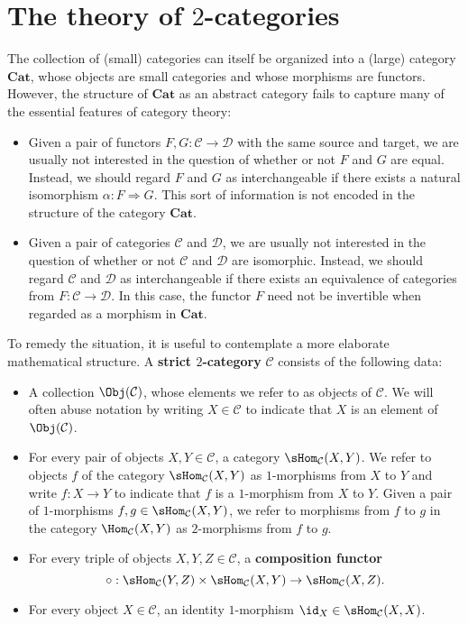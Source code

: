 \section{The theory of \texorpdfstring{$2$}{2}-categories}
The collection of (small) categories can itself be organized into a (large) category $\mathbf{Cat}$, whose objects are small categories and whose morphisms are functors. However, the structure of $\mathbf{Cat}$ as an abstract category fails to capture many of the essential features of category theory:
\begin{itemize}
\item Given a pair of functors $F,G:\mathcal{C}\to\mathcal{D}$ with the same source and target, we are usually not interested in the question of whether or not $F$ and $G$ are equal. Instead, we should regard $F$ and $G$ as interchangeable if there exists a natural isomorphism $\alpha:F\Rightarrow G$. This sort of information is not encoded in the structure of the category $\mathbf{Cat}$.
\item Given a pair of categories $\mathcal{C}$ and $\mathcal{D}$, we are usually not interested in the question of whether or not $\mathcal{C}$ and $\mathcal{D}$ are isomorphic. Instead, we should regard $\mathcal{C}$ and $\mathcal{D}$ as interchangeable if there exists an equivalence of categories from $F:\mathcal{C}\to\mathcal{D}$. In this case, the functor $F$ need not be invertible when regarded as a morphism in $\mathbf{Cat}$.
\end{itemize}
To remedy the situation, it is useful to contemplate a more elaborate mathematical structure. A \textbf{strict $2$-category} $\mathcal{C}$ consists of the following data:
\begin{itemize}
\item A collection $\Obj(\mathcal{C})$, whose elements we refer to as objects of $\mathcal{C}$. We will often abuse notation by writing $X\in\mathcal{C}$ to indicate that $X$ is an element of $\Obj(\mathcal{C})$.
\item For every pair of objects $X,Y\in\mathcal{C}$, a category $\sHom_{\mathcal{C}}(X,Y)$. We refer to objects $f$ of the category $\sHom_{\mathcal{C}}(X,Y)$ as $1$-morphisms from $X$ to $Y$ and write $f:X\to Y$ to indicate that $f$ is a $1$-morphism from $X$ to $Y$. Given a pair of $1$-morphisms $f,g\in\sHom_{\mathcal{C}}(X,Y)$, we refer to morphisms from $f$ to $g$ in the category $\Hom_{\mathcal{C}}(X,Y)$ as $2$-morphisms from $f$ to $g$.
\item For every triple of objects $X,Y,Z\in\mathcal{C}$, a \textbf{composition functor}
\[\circ:\sHom_{\mathcal{C}}(Y,Z)\times\sHom_{\mathcal{C}}(X,Y)\to\sHom_{\mathcal{C}}(X,Z).\]
\item For every object $X\in\mathcal{C}$, an identity $1$-morphism $\id_X\in\sHom_{\mathcal{C}}(X,X)$.
\end{itemize}
